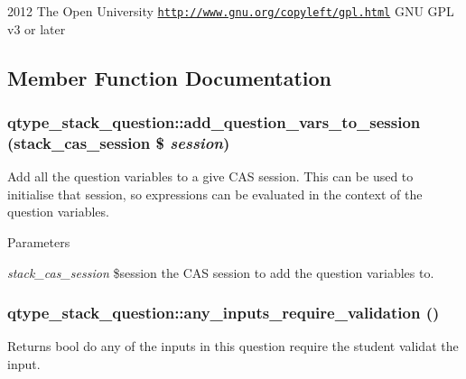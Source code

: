 2012 The Open University  \href{http://www.gnu.org/copyleft/gpl.html}{\tt http://www.gnu.org/copyleft/gpl.html} GNU GPL v3 or later 

\subsection{Member Function Documentation}
\hypertarget{classqtype__stack__question_a8b2f9ac27e9fe1d84abbef0487b4f755}{
\subsubsection[{add\_\-question\_\-vars\_\-to\_\-session}]{\setlength{\rightskip}{0pt plus 5cm}qtype\_\-stack\_\-question::add\_\-question\_\-vars\_\-to\_\-session (stack\_\-cas\_\-session \$ {\em session})}}
\label{classqtype__stack__question_a8b2f9ac27e9fe1d84abbef0487b4f755}
Add all the question variables to a give CAS session. This can be used to initialise that session, so expressions can be evaluated in the context of the question variables. 
\begin{DoxyParams}{Parameters}
\item[{\em stack\_\-cas\_\-session}]\$session the CAS session to add the question variables to. \end{DoxyParams}
\hypertarget{classqtype__stack__question_a9c8334e2954d87067010cd353b8b91b7}{
\subsubsection[{any\_\-inputs\_\-require\_\-validation}]{\setlength{\rightskip}{0pt plus 5cm}qtype\_\-stack\_\-question::any\_\-inputs\_\-require\_\-validation ()}}
\label{classqtype__stack__question_a9c8334e2954d87067010cd353b8b91b7}
\begin{DoxyReturn}{Returns}
bool do any of the inputs in this question require the student validat the input. 
\end{DoxyReturn}
